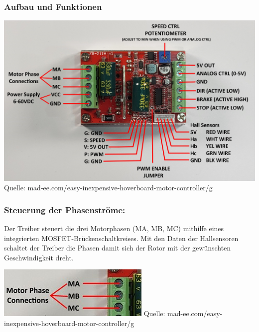 \documentclass[ngerman,12pt,a4paper]{article}
\begin{document}
			\subsubsection{Aufbau und Funktionen}
			
		\begin{center}
			\begin{minipage}{\textwidth}
				\centering
				\includegraphics[scale=0.15]{Pictures/ZS-X11H}
				\label{fig:spiffs_init}
				\vspace{-2pt}
				\small Quelle: mad-ee.com/easy-inexpensive-hoverboard-motor-controller/g
			\end{minipage}
		\end{center}
		\newpage
		\subsubsection*{Steuerung der Phasenströme:}
		Der Treiber steuert die drei Motorphasen (MA, MB, MC) mithilfe eines integrierten MOSFET-Brückenschaltkreises. Mit den Daten der Hallsensoren schaltet der Treiber die Phasen damit sich der Rotor mit der gewünschten Geschwindigkeit dreht.
		
		\begin{center}
			\begin{minipage}{\textwidth}
				\centering
				\includegraphics[scale=1]{Pictures/Motorphasen}
				\label{fig:spiffs_init}
				\vspace{-2pt}
				\small Quelle: mad-ee.com/easy-inexpensive-hoverboard-motor-controller/g
			\end{minipage}
		\end{center}
		
\end{document}
